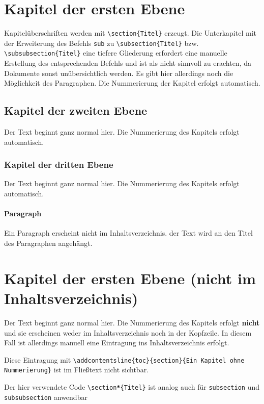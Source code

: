 \section{Kapitel der ersten Ebene}
Kapitelüberschriften werden mit \texttt{\textbackslash section\{Titel\}} erzeugt. Die Unterkapitel mit der Erweiterung des Befehls \texttt{sub} zu \texttt{\textbackslash subsection\{Titel\}} bzw. \texttt{\textbackslash subsubsection\{Titel\}} eine tiefere Gliederung erfordert eine manuelle Erstellung des entsprechenden Befehls und ist als nicht sinnvoll zu erachten, da Dokumente sonst unübersichtlich werden. Es gibt hier allerdings noch die Möglichkeit des Paragraphen. Die Nummerierung der Kapitel erfolgt automatisch.
\subsection{Kapitel der zweiten Ebene}
Der Text beginnt ganz normal hier. Die Nummerierung des Kapitels erfolgt automatisch.
\subsubsection{Kapitel der dritten Ebene}
Der Text beginnt ganz normal hier. Die Nummerierung des Kapitels erfolgt automatisch.
\paragraph{Paragraph}
Ein Paragraph erscheint nicht im Inhaltsverzeichnis. der Text wird an den Titel des Paragraphen angehängt.

\section*{Kapitel der ersten Ebene (nicht im Inhaltsverzeichnis)}
Der Text beginnt ganz normal hier. Die Nummerierung des Kapitels erfolgt \textbf{nicht} und sie erscheinen weder im Inhaltsverzeichnis noch in der Kopfzeile. In diesem Fall ist allerdings manuell eine Eintragung ins Inhaltsverzeichnis erfolgt. 

Diese Eintragung mit \texttt{\textbackslash addcontentsline\{toc\}\{section\}\{Ein Kapitel ohne Nummerierung\}} ist im Fließtext nicht sichtbar.

Der hier verwendete Code \texttt{\textbackslash section\textbf{*}\{Titel\}} ist analog auch für \texttt{subsection} und \texttt{subsubsection} anwendbar

